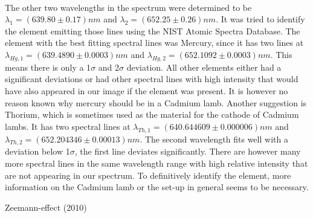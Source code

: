 \documentclass[12pt]{article}
\begin{document}
\\The other two wavelengths in the spectrum were determined to be $\lambda_1=(639.80\pm0.17)nm$ and $\lambda_2=(652.25\pm0.26)nm$. It was tried to identify the element emitting those lines using the NIST Atomic Spectra Database. The element with the best fitting spectral lines was Mercury, since it has two lines at $\lambda_{Hg,1}=(639.4890\pm0.0003)nm$ and $\lambda_{Hg,2}=(652.1092\pm0.0003)nm$. This means there is only a 1$\sigma$ and 2$\sigma$ deviation. All other elements either had a significant deviations or had other spectral lines with high intensity that would have also appeared in our image if the element was present. It is however no reason known why mercury should be in a Cadmium lamb. Another suggestion is Thorium, which is sometimes used as the material for the cathode of Cadmium lambs. It has two spectral lines at $\lambda_{Th,1}=(640.644609\pm0.000006)nm$ and $\lambda_{Th,2}=(652.204346\pm0.00013)nm$. The second wavelength fits well with a deviation below 1$\sigma$, the first line deviates significantly. There are however many more spectral lines in the same wavelength range with high relative intensity that are not appearing in our spectrum. To definitively identify the element, more information on the Cadmium lamb or the set-up in general seems to be necessary. 



\newpage
\begin{thebibliography}{00}   %

 Zeemann-effect (2010)

\end{thebibliography}
\end{document}
